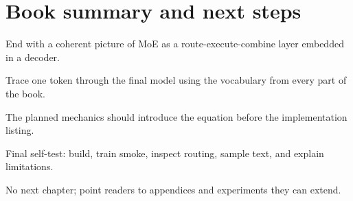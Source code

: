 \section{Book summary and next steps}
\label{sec:ch12-book-summary-and-next-steps}

End with a coherent picture of MoE as a route-execute-combine layer embedded in a decoder.



Trace one token through the final model using the vocabulary from every part of the book.



The planned mechanics should introduce the equation before the implementation listing.





\begin{checkpointbox}
Final self-test: build, train smoke, inspect routing, sample text, and explain limitations.
\end{checkpointbox}

No next chapter; point readers to appendices and experiments they can extend.
